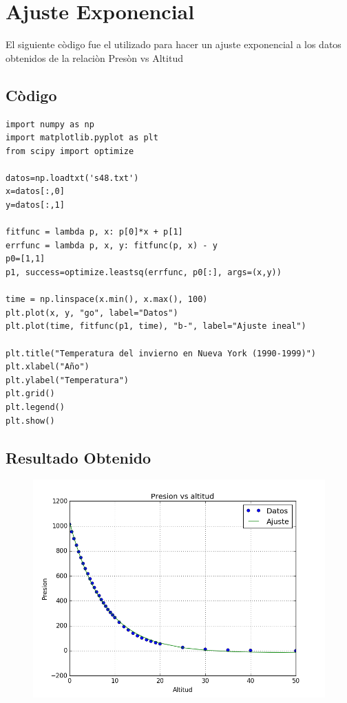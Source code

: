 \documentclass[12pt]{article}
\begin{document}
 
 \section{Ajuste Exponencial}
 El siguiente còdigo fue el utilizado para hacer un ajuste exponencial a los datos obtenidos de la relaciòn Presòn vs Altitud
\subsection{Còdigo}
\begin{verbatim}
import numpy as np
import matplotlib.pyplot as plt
from scipy import optimize

datos=np.loadtxt('s48.txt')
x=datos[:,0]
y=datos[:,1]

fitfunc = lambda p, x: p[0]*x + p[1]
errfunc = lambda p, x, y: fitfunc(p, x) - y 
p0=[1,1]
p1, success=optimize.leastsq(errfunc, p0[:], args=(x,y))

time = np.linspace(x.min(), x.max(), 100)
plt.plot(x, y, "go", label="Datos") 
plt.plot(time, fitfunc(p1, time), "b-", label="Ajuste ineal")

plt.title("Temperatura del invierno en Nueva York (1990-1999)")
plt.xlabel("Año")
plt.ylabel("Temperatura")
plt.grid()
plt.legend()
plt.show()
\end{verbatim}


\subsection{ Resultado Obtenido}
 \begin{figure}[H]
\centering
\includegraphics[scale=.5]{expo}
\end{figure}
\end{document}
